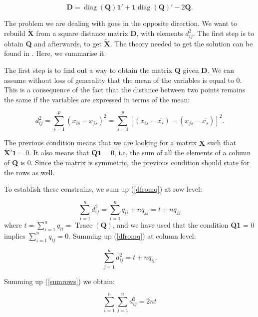 \documentclass[11pt]{report}
\DeclareMathOperator{\Tr}{Trace}
\DeclareMathOperator{\diag}{diag}
\begin{document}
\[
\mathbf{D} = \diag(\mathbf{Q}) \mathbf{1}' + \mathbf{1}\diag(\mathbf{Q})' - 2\mathbf{Q}.
\]

\indent The problem we are dealing with goes in the opposite direction. We want 
to rebuild $\mathbf{\widetilde{X}}$ from a square distance matrix \textbf{D}, 
with elements $d_{ij}^2$. The first step is to obtain \textbf{Q} and afterwards, 
to get $\mathbf{\widetilde{X}}$. The theory needed to get the solution can be 
found in \cite{pena_libro}. Here, we summarise it.

\indent The first step is to find out a way to obtain the matrix \textbf{Q} 
given \textbf{D}. We can assume without loss of generality that the mean of 
the variables is equal to 0. This is a consequence of the fact that the distance 
between two points remains the same if the variables are expressed in terms 
of the mean:


\begin{equation} \label{dtraslated}
d_{ij}^2 = \sum_{s = 1}^p (x_{is} - x_{js})^2 = \sum_{s=1} ^p [(x_{is} - \overline{x_s})- (x_{js} - \overline{x_s})]^2.
\end{equation}

\indent The previous condition means that we are looking for a matrix  
$\mathbf{\widetilde{X}}$ such that $\mathbf{\widetilde{X}'}\mathbf{1} = 0$. 
It also means that $\mathbf{Q}\mathbf{1} = 0$, i.e, the sum of all the elements 
of a column of \textbf{Q} is 0. Since the matrix is symmetric, the previous 
condition should state for the rows as well. 

\indent To establish these constrains, we sum up (\ref{dfromq}) at row level:

\begin{equation} \label{sumrows}
\sum_{i = 1}^n d_{ij}^2 = \sum_{i = 1}^n q_{ii} + nq_{jj} = t + nq_{jj}
\end{equation}
where $t = \sum_{i = 1}^n q_{ii} = \Tr(\mathbf{Q})$, and we have used that the
condition \textbf{Q}\textbf{1} = 0 implies $\sum_{i = 1}^n q_{ij} = 0$. Summing 
up (\ref{dfromq}) at column level:

\begin{equation} \label{sumcols}
\sum_{j = 1}^n d_{ij}^2 = t + nq_{ii}.
\end{equation}

\indent Summing up (\ref{sumrows}) we obtain:

\begin{equation} \label{doublesum}
\sum_{i = 1}^n\sum_{j = 1}^n d_{ij}^2 = 2nt
\end{equation}
\end{document}
